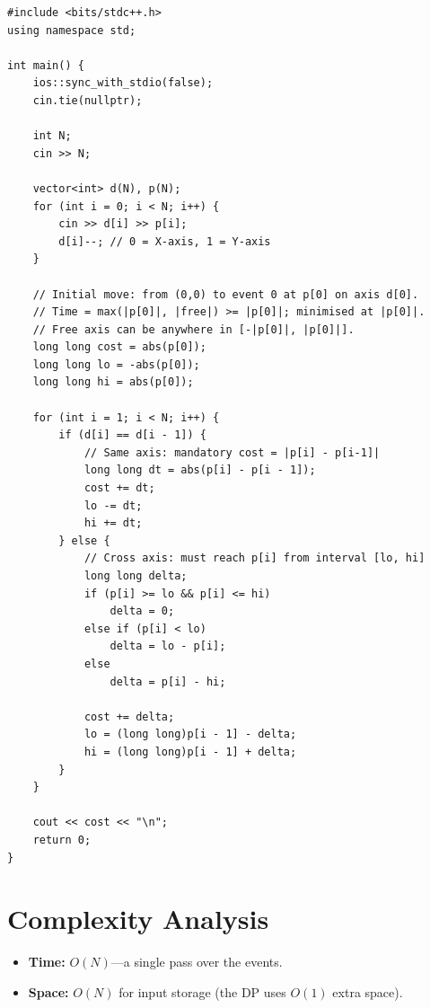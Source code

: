 \documentclass[11pt,a4paper]{article}
\begin{document}
\begin{lstlisting}
#include <bits/stdc++.h>
using namespace std;

int main() {
    ios::sync_with_stdio(false);
    cin.tie(nullptr);

    int N;
    cin >> N;

    vector<int> d(N), p(N);
    for (int i = 0; i < N; i++) {
        cin >> d[i] >> p[i];
        d[i]--; // 0 = X-axis, 1 = Y-axis
    }

    // Initial move: from (0,0) to event 0 at p[0] on axis d[0].
    // Time = max(|p[0]|, |free|) >= |p[0]|; minimised at |p[0]|.
    // Free axis can be anywhere in [-|p[0]|, |p[0]|].
    long long cost = abs(p[0]);
    long long lo = -abs(p[0]);
    long long hi = abs(p[0]);

    for (int i = 1; i < N; i++) {
        if (d[i] == d[i - 1]) {
            // Same axis: mandatory cost = |p[i] - p[i-1]|
            long long dt = abs(p[i] - p[i - 1]);
            cost += dt;
            lo -= dt;
            hi += dt;
        } else {
            // Cross axis: must reach p[i] from interval [lo, hi]
            long long delta;
            if (p[i] >= lo && p[i] <= hi)
                delta = 0;
            else if (p[i] < lo)
                delta = lo - p[i];
            else
                delta = p[i] - hi;

            cost += delta;
            lo = (long long)p[i - 1] - delta;
            hi = (long long)p[i - 1] + delta;
        }
    }

    cout << cost << "\n";
    return 0;
}
\end{lstlisting}

\section{Complexity Analysis}
\begin{itemize}
  \item \textbf{Time:} $O(N)$---a single pass over the events.
  \item \textbf{Space:} $O(N)$ for input storage (the DP uses $O(1)$
        extra space).
\end{itemize}
\end{document}
